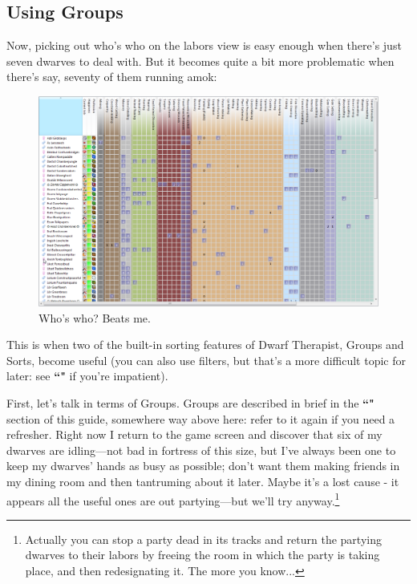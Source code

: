 \documentclass[]{article}
\begin{document}
\newpage
\subsection{Using Groups}
\label{sec:Using Groups}
Now, picking out who's who on the labors view is easy enough when there's just seven dwarves to deal
with. But it becomes quite a bit more problematic when there's say, seventy of them running amok:
\begin{figure}[h!] \centering \includegraphics[width=\linewidth]{Sec2Fig6}
\caption{Who's who? Beats me.}
\end{figure}

This is when two of the built-in sorting features of Dwarf Therapist, Groups and Sorts,  become useful
(you can also use filters, but that's a more difficult topic for later: see 
\textbf{``"} if you're impatient).

First, let's talk in terms of Groups. Groups are described in brief in the \textbf{``"} section of this guide, somewhere way above here: refer to it again if you need a
refresher. Right now I return to the game screen and discover that six of my dwarves are idling---not bad
in fortress of this size, but I've always been one to keep my dwarves' hands as busy as possible; don't
want them making friends in my dining room and then tantruming about it later. Maybe it's a lost cause -
it appears all the useful ones are out partying---but we'll try anyway.\footnote{Actually you can stop a
party dead in its tracks and return the partying dwarves to their labors by freeing the room in which the
party is taking place, and then redesignating it. The more you know...}
\end{document}
